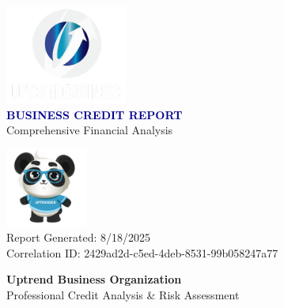 \documentclass[11pt,a4paper]{article}
\begin{document}
\begin{titlepage}
    \centering
    \vspace*{2cm}
    
    \includegraphics[width=0.3\textwidth]{uptrend_logo.png}\\[1cm]
    
    {\huge\textbf{\textcolor{darkblue}{BUSINESS CREDIT REPORT}}}\\[0.5cm]
    
    {\Large\textcolor{uptrendblue}{Comprehensive Financial Analysis}}\\[2cm]
    
    
    \vspace{2cm}
    
    \includegraphics[width=0.2\textwidth]{uptrend_mascot.png}\\[1cm]
    
    {\large\textcolor{uptrendgray}{Report Generated: 8/18/2025}}\\[0.3cm]
    {\large\textcolor{uptrendgray}{Correlation ID: 2429ad2d-c5ed-4deb-8531-99b058247a77}}
    
    \vfill
    
    {\textcolor{uptrendblue}{\textbf{Uptrend Business Organization}}}\\
    {\small Professional Credit Analysis \& Risk Assessment}
    
\end{titlepage}
\end{document}
